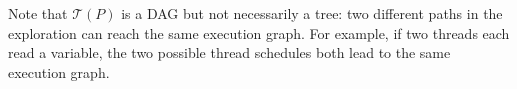 Note that $\mathcal{T}(P)$ is a DAG but not necessarily a tree: two 
different paths in the exploration can reach the same execution graph.
For example, if two threads each read a variable, the two possible thread schedules both lead to the same execution graph.

